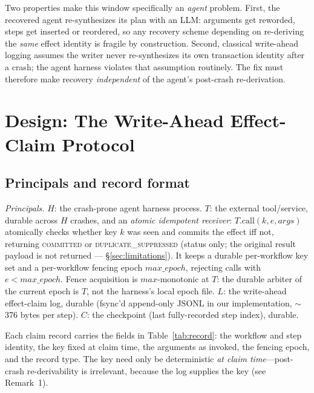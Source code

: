 \documentclass[10pt,journal,compsoc]{IEEEtran}
\begin{document}
Two properties make this window specifically an \emph{agent}
problem. First, the recovered agent re-synthesizes its plan with
an LLM: arguments get reworded, steps get inserted or reordered,
so any recovery scheme depending on re-deriving the \emph{same}
effect identity is fragile by construction. Second, classical
write-ahead logging assumes the writer never re-synthesizes its
own transaction identity after a crash; the agent harness
violates that assumption routinely. The fix must therefore make
recovery \emph{independent} of the agent's post-crash
re-derivation.

\section{Design: The Write-Ahead Effect-Claim Protocol}
\label{sec:design}

\subsection{Principals and record format}

\emph{Principals.} $H$: the crash-prone agent harness process.
$T$: the external tool/service, durable across $H$ crashes, and
an \emph{atomic idempotent receiver}: $T.\mathrm{call}(k, e,
\mathit{args})$ atomically checks whether key $k$ was seen and
commits the effect iff not, returning \textsc{committed} or
\textsc{duplicate\_suppressed} (status only; the original result
payload is not returned — §\ref{sec:limitations}). It keeps a durable
per-workflow key set and a per-workflow fencing epoch
$\mathit{max\_epoch}$, rejecting calls with $e <
\mathit{max\_epoch}$. Fence acquisition is
$\mathit{max}$-monotonic at $T$: the durable arbiter of the
current epoch is $T$, not the harness's local epoch file. $L$: the
write-ahead effect-claim log, durable (fsync'd append-only JSONL
in our implementation, $\sim$376 bytes per step). $C$: the
checkpoint (last fully-recorded step index), durable.

Each claim record carries the fields in Table~\ref{tab:record}:
the workflow and step identity, the key fixed at claim time, the
arguments as invoked, the fencing epoch, and the record type.
The key need only be deterministic \emph{at claim time}---post-crash
re-derivability is irrelevant, because the log supplies the key
(see Remark~1).
\end{document}
